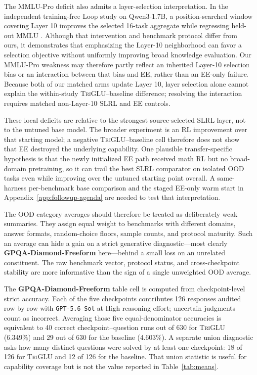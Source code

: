 \documentclass[10pt]{article}
\newcommand{\TriGLU}{\textsc{TriGLU}}
\begin{document}
The MMLU-Pro deficit also admits a layer-selection interpretation.  In the
independent training-free Loop study on Qwen3-1.7B, a position-searched window
covering Layer 10 improves the selected 16-task aggregate while regressing
held-out MMLU \citep{chen2026looped}.  Although that intervention and benchmark
protocol differ from ours, it demonstrates that emphasizing the Layer-10
neighborhood can favor a selection objective without uniformly improving broad
knowledge evaluation.  Our MMLU-Pro weakness may therefore partly reflect an
inherited Layer-10 selection bias or an interaction between that bias and EE,
rather than an EE-only failure.  Because both of our matched arms update Layer
10, layer selection alone cannot explain the within-study \TriGLU{}--baseline
difference; resolving the interaction requires matched non-Layer-10 SLRL and EE
controls.

These local deficits are relative to the strongest source-selected SLRL layer,
not to the untuned base model.  The broader experiment is an RL improvement over
that starting model; a negative \TriGLU{}--baseline cell therefore does not show
that EE destroyed the underlying capability.  One plausible transfer-specific
hypothesis is that the newly initialized EE path received math RL but no
broad-domain pretraining, so it can trail the best SLRL comparator on isolated
OOD tasks even while improving over the untuned starting point overall.  A
same-harness per-benchmark base comparison and the staged EE-only warm start in
Appendix~\ref{app:followup-agenda} are needed to test that interpretation.

The OOD category averages should therefore be treated as deliberately weak
summaries.  They assign equal weight to benchmarks with different domains,
answer formats, random-choice floors, sample counts, and protocol maturity.
Such an average can hide a gain on a strict generative diagnostic---most clearly
\textbf{GPQA-Diamond-Freeform} here---behind a small loss on an unrelated constituent.
The raw benchmark vector, protocol status, and cross-checkpoint stability are
more informative than the sign of a single unweighted OOD average.

The \textbf{GPQA-Diamond-Freeform} table cell is computed from checkpoint-level strict
accuracy.  Each of the five checkpoints contributes 126 responses audited
row by row with \texttt{GPT-5.6 Sol} at High reasoning effort; uncertain
judgments count as incorrect.  Averaging those five
equal-denominator accuracies is equivalent to 40 correct checkpoint--question
runs out of 630 for \TriGLU{} (6.349\%) and 29 out of 630 for the baseline
(4.603\%).  A separate union diagnostic asks how many distinct questions were
solved by at least one checkpoint: 18 of 126 for \TriGLU{} and 12 of 126 for
the baseline.  That union statistic is useful for capability coverage but is
not the value reported in Table~\ref{tab:means}.
\end{document}

